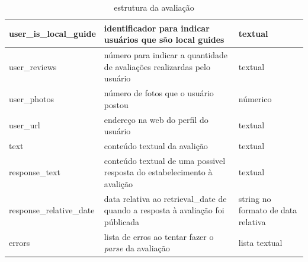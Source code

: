 \begin{table}[]
\begin{tabular}{|l|p{5cm}|p{5cm}|}
		\hline
		user\_is\_local\_guide    & identificador para indicar usuários que são local guides                        & textual                                                                        \\
		\hline
		user\_reviews             & número para indicar a quantidade de avaliações realizardas pelo usuário         & textual                                                                        \\
		\hline
		user\_photos              & número de fotos que o usuário postou                                            & númerico                                                                       \\
		\hline
		user\_url                 & endereço na web do perfil do usuário                                            & textual                                                                        \\
		\hline
		text                      & conteúdo textual da avalição                                                    & textual                                                                        \\
		\hline
		response\_text            & conteúdo textual de uma possivel resposta do estabelecimento à avalição         & textual                                                                        \\
		\hline
		response\_relative\_date  & data relativa ao retrieval\_date de quando a resposta à avaliação foi públicada & string no formato de data relativa                                             \\
		\hline
		errors                    & lista de erros ao tentar fazer o \emph{parse} da avaliação                      & lista textual                                                                  \\
		\hline
	\end{tabular}
	\caption{estrutura da avaliação}
	\label{tab:estrutura_review}
\end{table}





